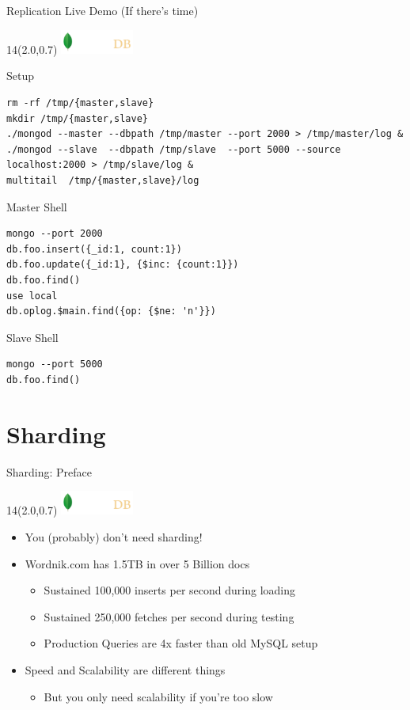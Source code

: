 \documentclass{beamer}
\newcommand{\MongoLogo}{
\begin{textblock}{14}(2.0,0.7)
  \includegraphics[height=0.8cm]{logo-mongodb-ondark.png}
\end{textblock}
}
\begin{document}
\begin{frame}[fragile]{Replication Live Demo (If there's time)}
  \MongoLogo

  \begin{block}{Setup}
    \tiny
    \begin{verbatim}
rm -rf /tmp/{master,slave}
mkdir /tmp/{master,slave}
./mongod --master --dbpath /tmp/master --port 2000 > /tmp/master/log &
./mongod --slave  --dbpath /tmp/slave  --port 5000 --source localhost:2000 > /tmp/slave/log &
multitail  /tmp/{master,slave}/log
    \end{verbatim}
  \end{block}

  \begin{block}{Master Shell}
    \tiny
    \begin{verbatim}
mongo --port 2000
db.foo.insert({_id:1, count:1})
db.foo.update({_id:1}, {$inc: {count:1}})
db.foo.find()
use local
db.oplog.$main.find({op: {$ne: 'n'}})
    \end{verbatim}
  \end{block}

  \begin{block}{Slave Shell}
    \tiny
    \begin{verbatim}
mongo --port 5000
db.foo.find()
    \end{verbatim}
  \end{block}

\end{frame}


\section{Sharding}
\begin{frame}[fragile]{Sharding: Preface}
  \MongoLogo
  \begin{itemize}
    \item You {\tiny (probably)} don't need sharding!

    \item Wordnik.com has 1.5TB in over 5 Billion docs
      \begin{itemize}
        \item Sustained 100,000 inserts per second during loading
        \item Sustained 250,000 fetches per second during testing
        \item Production Queries are 4x faster than old MySQL setup
      \end{itemize}

    \item Speed and Scalability are different things
      \begin{itemize}
        \item But you only need scalability if you're too slow
      \end{itemize}

  \end{itemize}
\end{frame}
\end{document}
